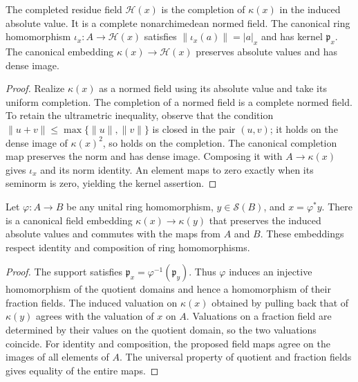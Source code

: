 \begin{definition}
\label{spectrum:completed-residue-field}
\leanok
{}
The completed residue field $\mathcal H(x)$ is the completion of
$\kappa(x)$ in the induced absolute value. It is a complete nonarchimedean
normed field. The canonical ring homomorphism $\iota_x:A\to\mathcal H(x)$
satisfies $\|\iota_x(a)\|=|a|_x$ and has kernel $\mathfrak p_x$.
The canonical embedding $\kappa(x)\to\mathcal H(x)$ preserves absolute
values and has dense image.
\end{definition}
\begin{proof}
Realize $\kappa(x)$ as a normed field using its absolute value and take
its uniform completion. The completion of a normed field is a complete
normed field. To retain the ultrametric inequality, observe that the
condition $\|u+v\|\le\max\{\|u\|,\|v\|\}$ is closed in the pair $(u,v)$;
it holds on the dense image of $\kappa(x)^2$, so holds on the completion.
The canonical completion map preserves the norm and has dense image.
Composing it with $A\to\kappa(x)$ gives $\iota_x$ and its norm identity.
An element maps to zero exactly when its seminorm is zero, yielding the
kernel assertion.
\end{proof}

\begin{theorem}
\label{spectrum:residue-field-pullback}
\leanok
{}
Let $\varphi:A\to B$ be any unital ring homomorphism, $y\in\mathcal S(B)$,
and $x=\varphi^*y$. There is a canonical field embedding
$\kappa(x)\to\kappa(y)$ that preserves the induced absolute values and
commutes with the maps from $A$ and $B$. These embeddings respect identity
and composition of ring homomorphisms.
\end{theorem}
\begin{proof}
The support satisfies $\mathfrak p_x=\varphi^{-1}(\mathfrak p_y)$.
Thus $\varphi$ induces an injective homomorphism of the quotient domains
and hence a homomorphism of their fraction fields. The induced valuation
on $\kappa(x)$ obtained by pulling back that of $\kappa(y)$ agrees with
the valuation of $x$ on $A$. Valuations on a fraction field are determined
by their values on the quotient domain, so the two valuations coincide.
For identity and composition, the proposed field maps agree on the images
of all elements of $A$. The universal property of quotient and fraction
fields gives equality of the entire maps.
\end{proof}

